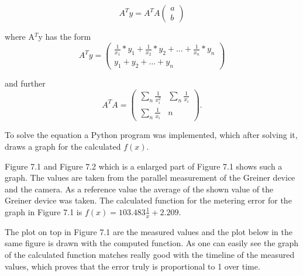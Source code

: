 \documentclass[12pt, a4paper]{report}
\begin{document}
 \begin{equation}
A^T y = A^T A
\begin{pmatrix}
a \\ b \end{pmatrix}
 \end{equation}
 
where A$^T$y has the form
 \begin{equation}
A^T y = 
\begin{pmatrix}
\frac{1}{x_1}*y_1 +\frac{1}{x_2}*y_2 + \ldots + \frac{1}{x_n}*y_n \\ y_1 + y_2 + \ldots + y_n \end{pmatrix}
 \end{equation}
 
 and further 
  \begin{equation}
A^T A= 
\begin{pmatrix}
\sum_n  \frac{1}{x_i^2} & \sum_{n} \frac{1}{x_i} \\ \sum_{n} \frac{1}{x_i} & n  \end{pmatrix}.
 \end{equation}
 
 To solve the equation a Python program was implemented, which after solving it, draws a graph for the calculated $f(x)$. 
 
Figure 7.1 and Figure 7.2 which is a enlarged part of Figure 7.1 shows such a graph. The values are taken from the parallel measurement of the Greiner device and the camera. As a reference value the average of the shown value of the Greiner device was taken. The calculated function for the metering error for the graph in Figure 7.1 is \( f(x) = 103.483 \frac{1}{x} + 2.209 \). 


The plot on top in Figure 7.1 are the measured values and the plot below in the same figure is drawn with the computed function. As one can easily see the graph of the calculated function matches really good with the timeline of the measured values, which proves that the error truly is proportional to 1 over time. 
\end{document}
